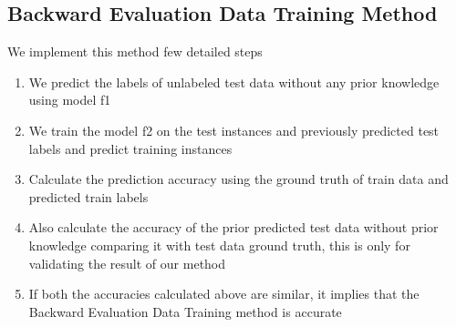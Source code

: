 \documentclass[a4paper,conference]{IEEEtran}
\begin{document}
\subsection{Backward Evaluation Data Training Method}
We implement this method few detailed steps
\begin{enumerate}
\item We predict the labels of unlabeled test data without any prior knowledge using model f1
\item We train the model f2 on the test instances and previously predicted test labels and predict training instances
\item Calculate the prediction accuracy using the ground truth of train data and predicted train labels
\item Also calculate the accuracy of the prior predicted test data without prior knowledge comparing it with test data ground truth, this is only for validating the result of our method
\item If both the accuracies calculated above are similar, it implies that the Backward Evaluation Data Training method is accurate
\end{enumerate}

\end{document}
